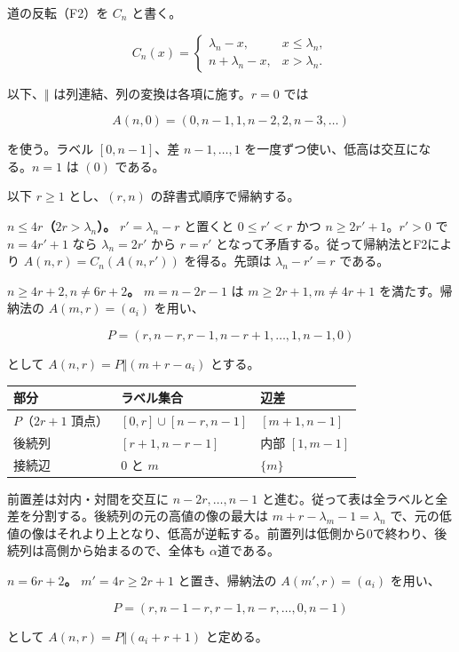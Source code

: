\documentclass[
  10pt,
  a4paper,
]{article}
\begin{document}
道の反転（F2）を \(C_n\) と書く。

\[
C_n(x)=
\begin{cases}
\lambda_n-x,&x\le\lambda_n,\\
n+\lambda_n-x,&x>\lambda_n.
\end{cases}
\]

以下、\(\Vert\) は列連結、列の変換は各項に施す。\(r=0\) では

\[
A(n,0)=(0,n-1,1,n-2,2,n-3,\ldots)
\]

を使う。ラベル \([0,n-1]\)、差 \(n-1,\ldots,1\)
を一度ずつ使い、低高は交互になる。\(n=1\) は \((0)\) である。

以下 \(r\ge1\) とし、\((r,n)\) の辞書式順序で帰納する。

\textbf{\(n\le4r\)（\(2r>\lambda_n\)）。} \(r'=\lambda_n-r\) と置くと
\(0\le r'<r\) かつ \(n\ge2r'+1\)。\(r'>0\) で \(n=4r'+1\) なら
\(\lambda_n=2r'\) から \(r=r'\) となって矛盾する。従って帰納法とF2により
\(A(n,r)=C_n(A(n,r'))\) を得る。先頭は \(\lambda_n-r'=r\) である。

\textbf{\(n\ge4r+2,n\ne6r+2\)。} \(m=n-2r-1\) は \(m\ge2r+1,m\ne4r+1\)
を満たす。帰納法の \(A(m,r)=(a_i)\) を用い、

\[
P=(r,n-r,r-1,n-r+1,\ldots,1,n-1,0)
\]

として \(A(n,r)=P\Vert(m+r-a_i)\) とする。

\begin{longtable}[]{@{}lll@{}}
\toprule\noalign{}
部分 & ラベル集合 & 辺差 \\
\midrule\noalign{}
\endhead
\bottomrule\noalign{}
\endlastfoot
\(P\)（\(2r+1\) 頂点） & \([0,r]\cup[n-r,n-1]\) & \([m+1,n-1]\) \\
後続列 & \([r+1,n-r-1]\) & 内部 \([1,m-1]\) \\
接続辺 & \(0\) と \(m\) & \(\{m\}\) \\
\end{longtable}

前置差は対内・対間を交互に \(n-2r,\ldots,n-1\)
と進む。従って表は全ラベルと全差を分割する。後続列の元の高値の像の最大は
\(m+r-\lambda_m-1=\lambda_n\)
で、元の低値の像はそれより上となり、低高が逆転する。前置列は低側から0で終わり、後続列は高側から始まるので、全体も
\(\alpha\)道である。

\textbf{\(n=6r+2\)。} \(m'=4r\ge2r+1\) と置き、帰納法の
\(A(m',r)=(a_i)\) を用い、

\[
P=(r,n-1-r,r-1,n-r,\ldots,0,n-1)
\]

として \(A(n,r)=P\Vert(a_i+r+1)\) と定める。
\end{document}
